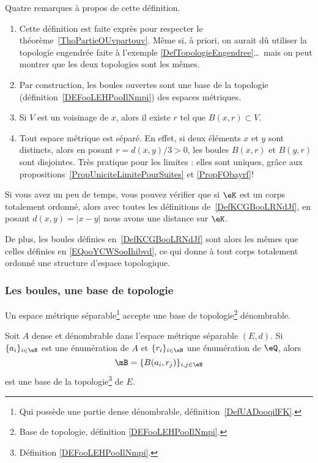 \begin{remark}  \label{RemQDRooKnwKk}
    Quatre remarques à propos de cette définition.
    \begin{enumerate}
    \item
      Cette définition est faite exprès pour respecter le théorème~\ref{ThoPartieOUvpartouv}. Même si, à priori, on aurait dû utiliser la topologie engendrée faite à l'exemple \ref{DefTopologieEngendree}\dots\ mais on peut montrer que les deux topologies sont les mêmes.
    \item      \label{ITEMooUIHJooXAFaIz}
      Par construction, les boules ouvertes sont une base de la topologie (définition~\ref{DEFooLEHPooIlNmpi}) des espaces métriques.
    \item       \label{ITEMooUIHJooXAFaJa}
      Si \( V\) est un voisinage de \( x\), alors il existe \( r\) tel que \( B(x,r)\subset V\).
    \item
      Tout espace métrique est séparé. En effet, si deux éléments \( x \) et \( y \) sont distincts, alors en posant \( r = d(x , y) / 3 > 0 \), les boules \( B(x,r) \) et \( B(y,r)\) sont disjointes. Très pratique pour les limites : elles sont uniques, grâce aux propositions~\ref{PropUniciteLimitePourSuites} et \ref{PropFObayrf}!
    \end{enumerate}
\end{remark}

\begin{normaltext}
    Si vous avez un peu de temps, vous pouvez vérifier que si \( \eK\) est un corps totalement ordonné, alors avec toutes les définitions de~\ref{DefKCGBooLRNdJf}, en posant \( d(x,y)=| x-y |\) nous avons une distance sur \( \eK\).

    De plus, les boules définies en~\ref{DefKCGBooLRNdJf} sont alors les mêmes que celles définies en \eqref{EQooYCWSooIhibvd}, ce qui donne à tout corps totalement ordonné une structure d'espace topologique.
\end{normaltext}

\subsubsection{Les boules, une base de topologie}

\begin{proposition} \label{PropNBSooraAFr}
    Un espace métrique séparable\footnote{Qui possède une partie dense dénombrable, définition~\ref{DefUADooqilFK}.} accepte une base de topologie\footnote{Base de topologie, définition \ref{DEFooLEHPooIlNmpi}.} dénombrable.

     Soit \( A\) dense et dénombrable dans l'espace métrique séparable \( (E,d)\). Si \( \{ a_i \}_{i\in \eN}\) est une énumération de \( A\) et \( \{ r_i \}_{i\in \eN}\) une énumération de \( \eQ\), alors
    \begin{equation}
        \mB=\{ B(a_i,r_j) \}_{i,j\in \eN}
    \end{equation}
    est une base de la topologie\footnote{Définition \ref{DEFooLEHPooIlNmpi}.} de \( E\).
\end{proposition}

